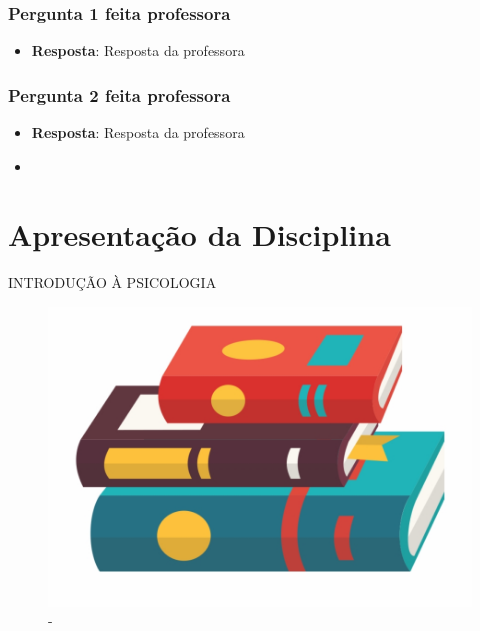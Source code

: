 \documentclass[
]{book}
\providecommand{\tightlist}{%
  \setlength{\itemsep}{0pt}\setlength{\parskip}{0pt}}
\begin{document}
\hypertarget{pergunta-1-feita-professora}{%
\subsection{Pergunta 1 feita professora}\label{pergunta-1-feita-professora}}

\begin{itemize}
\tightlist
\item
  \textbf{Resposta}: Resposta da professora
\end{itemize}

\hypertarget{pergunta-2-feita-professora}{%
\subsection{Pergunta 2 feita professora}\label{pergunta-2-feita-professora}}

\begin{itemize}
\tightlist
\item
  \textbf{Resposta}: Resposta da professora
\end{itemize}

\begin{itemize}
\tightlist
\item
\end{itemize}

\hypertarget{apresentauxe7uxe3o-da-disciplina-1}{%
\chapter{Apresentação da Disciplina}\label{apresentauxe7uxe3o-da-disciplina-1}}

INTRODUÇÃO À PSICOLOGIA

\begin{figure}

{\centering \includegraphics[width=0.5\linewidth]{figuras/LIVRO-GENERICO} 

}

\caption{-}\label{fig:unnamed-chunk-16}
\end{figure}
\end{document}
